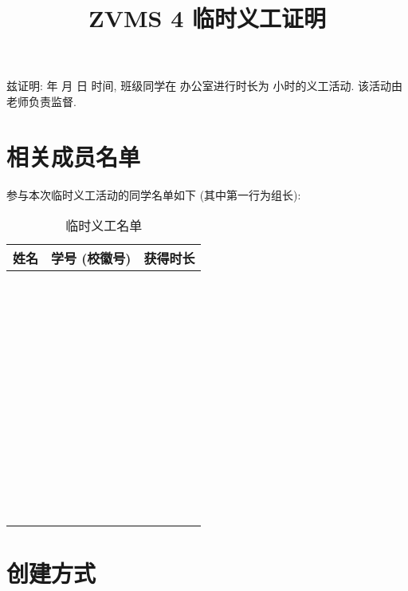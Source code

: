 \documentclass{article}
\title{ZVMS 4 临时义工证明}
\date{}
\begin{document}
\maketitle

兹证明: \underline{\hspace{4em}} 年 \underline{\hspace{2em}} 月 \underline{\hspace{2em}} 日 \underline{\hspace{4em}} 时间, \underline{\hspace{4em}} 班级同学在 \underline{\hspace{3em}} 办公室进行时长为 \underline{\hspace{4em}} 小时的义工活动. 该活动由 \underline{\hspace{4em}} 老师负责监督.

\section{相关成员名单}

参与本次临时义工活动的同学名单如下 (其中第一行为组长):

\begin{table}[H]
  \centering
  \begin{tabular}{|c|c|c|}
    \hline
    \textbf{\hspace{2em}姓名\hspace{2em}} & \textbf{\hspace{2em}学号 (校徽号)\hspace{2em}} & \textbf{\hspace{1em}获得时长\hspace{1em}} \\
    \hline
    ~&~&~\\\hline~&~&~\\\hline~&~&~\\\hline~&~&~\\\hline~&~&~\\\hline~&~&~\\\hline~&~&~\\\hline~&~&~\\\hline~&~&~\\\hline~&~&~\\\hline~&~&~\\
    \hline
  \end{tabular}
  \caption{临时义工名单}
\end{table}

\section{创建方式}
\end{document}
